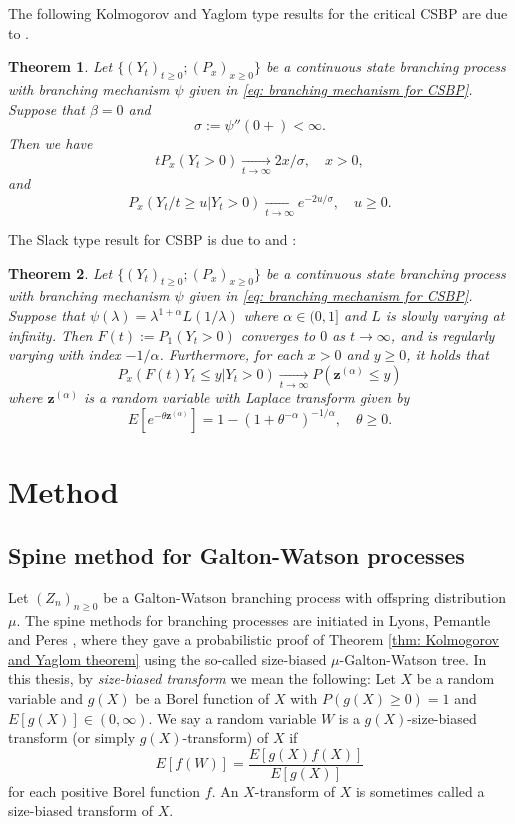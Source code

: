 \documentclass[UTF8]{pkuthss}
\theoremstyle{plain}
\newtheorem{thm}{Theorem}[section]
\theoremstyle{definition}
\numberwithin{equation}{section}
\begin{document}
	The following Kolmogorov and Yaglom type results for the critical CSBP are due to \cite{Li2000Asymptotic}.
\begin{thm}
	Let $\{(Y_t)_{t\geq 0}; (P_x)_{x\geq 0}\}$ be a continuous state branching process with branching mechanism $\psi$ given in \eqref{eq: branching mechanism for CSBP}. Suppose that $\beta = 0$ and 
\[
	\sigma := \psi''(0+) < \infty.
\]
	Then we have
\[
	t P_x(Y_t > 0) \xrightarrow[t\to \infty]{} 2x/\sigma, \quad x> 0,
\]
	and 
\[
	P_x( Y_t/t \geq u |Y_t>0) \xrightarrow[t\to \infty]{} e^{-2u/\sigma},\quad u\geq 0.
\]
\end{thm}
	The Slack type result for CSBP is due to \cite{KyprianouPardo2008Continuous} and \cite{RenYangZhao2014Conditional}:
\begin{thm}
	Let $\{(Y_t)_{t\geq 0}; (P_x)_{x\geq 0}\}$ be a continuous state branching process with branching mechanism $\psi$ given in \eqref{eq: branching mechanism for CSBP}. 
	Suppose that $\psi(\lambda)= \lambda^{1+\alpha}L(1/\lambda)$ where $\alpha \in (0,1]$ and $L$ is slowly varying at infinity. Then $F(t):= P_1(Y_t >0)$ converges to $0$ as $t\to \infty$, and is regularly varying with index $-1/\alpha$. Furthermore, for each $x>0$ and $y\geq 0$, it holds that
\[
	P_x(F(t)Y_t\leq y|Y_t>0) \xrightarrow[t\to \infty]{} P(\mathbf z^{(\alpha)}\leq y)
\]
	where $\mathbf z^{(\alpha)}$ is a random variable with Laplace transform given by
\[
	E[e^{-\theta \mathbf z^{(\alpha)}}] = 1-(1+\theta^{-\alpha})^{-1/\alpha},\quad \theta \geq0.
\]
\end{thm}

\section{Method}
\subsection{Spine method for Galton-Watson processes}
\label{sec: Methods}
	Let $(Z_n)_{n\geq 0}$ be a Galton-Watson branching process with offspring distribution $\mu$. The spine methods for branching processes are initiated in Lyons, Pemantle and Peres \cite{LyonsPemantlePeres1995Conceptual}, where they gave a probabilistic proof of Theorem \ref{thm: Kolmogorov and Yaglom theorem} using the so-called size-biased $\mu$-Galton-Watson tree.
In this thesis, by \emph{size-biased transform} we mean the following:
Let $X$ be a random variable
and $g(X)$ be a Borel function of $X$ with $P(g(X) \geq 0) = 1$ and $E[g(X)]\in (0,\infty)$.
We say a random variable $W$ is
a $g(X)$-size-biased transform (or simply $g(X)$-transform) of $X$ if
\[
E[f( W )]
= \frac{ E[g(X)f(X)]}{E[g(X)]}
\]
for each positive Borel function $f$.
An $X$-transform of $X$ is sometimes called a size-biased transform of $X$.
\end{document}
